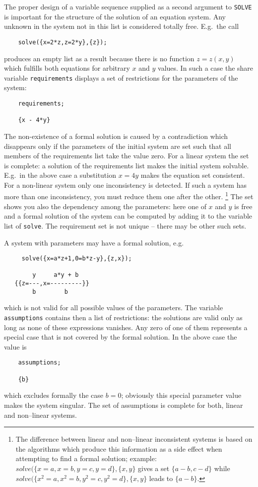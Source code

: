 The proper design of a variable sequence
supplied as a second argument to {\tt SOLVE} is important
for the structure of the solution of an equation system.
Any unknown in the system
not in this list is considered totally free. E.g.\  the call
\begin{verbatim}
    solve({x=2*z,z=2*y},{z});
\end{verbatim}
produces an empty list as a result because there is no function
$z=z(x,y)$ which fulfills both equations for arbitrary $x$ and $y$ values.
In such a case the share variable {\tt requirements}
displays a set of restrictions for the parameters of the system:
\begin{verbatim}
    requirements;

    {x - 4*y}
\end{verbatim}
The non-existence of a formal solution is caused by a
contradiction which disappears only if the parameters
of the initial system are set such that all members
of the requirements list take the value zero.
For a linear system the set is complete: a solution
of the requirements list makes the initial
system solvable. E.g.\  in the above case a substitution
$x=4y$ makes the equation set consistent. For a non-linear
system only one inconsistency is detected. If such a system
has more than one inconsistency, you must reduce them
one after the other.
\footnote{
The difference between linear and non--linear
inconsistent systems is based on the algorithms which
produce this information as a side effect when attempting
to find a formal solution; example:
$solve(\{x=a,x=b,y=c,y=d\},\{x,y\}$ gives a set $\{a-b,c-d\}$
while $solve(\{x^2=a,x^2=b,y^2=c,y^2=d\},\{x,y\}$ leads to $\{a-b\}$.
}
The  set shows you also the dependency among the parameters: here
one of $x$ and $y$ is free and a formal solution of the system can be
computed by adding it to the variable list of {\tt solve}.
The requirement set is not unique -- there may be other such sets.


A system  with parameters may have a formal solution, e.g.\
\begin{verbatim}
     solve({x=a*z+1,0=b*z-y},{z,x});

        y     a*y + b
   {{z=---,x=---------}}
        b        b
\end{verbatim}
which is not valid for all possible values of the parameters.
The variable {\tt assumptions} contains then a list of
restrictions: the solutions are valid only as long
as none of these expressions vanishes. Any zero of one of them
represents a special case that is not covered by the
formal solution. In the above case the value is
\begin{verbatim}
    assumptions;

    {b}
\end{verbatim}
which excludes formally the case $b=0$; obviously this special
parameter value makes the system singular. The set of assumptions
is complete for both, linear and non--linear systems.


